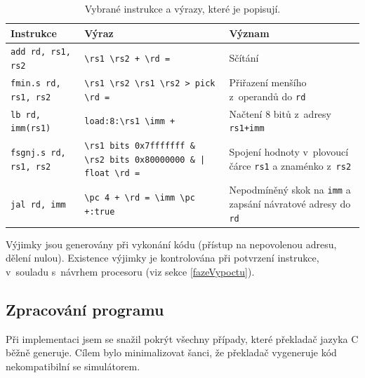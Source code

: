 \begin{table}[]
\begin{tabular}{|l|p{5cm}|p{5cm}|}
\hline
Instrukce            & Výraz                                                                                                                  & Význam                                                   \\ \hline\hline
\texttt{add rd, rs1, rs2}     & \texttt{\textbackslash{}rs1 \textbackslash{}rs2 + \textbackslash{}rd =}                                                         & Sčítání                                                  \\ \hline
\texttt{fmin.s rd, rs1, rs2}  & \texttt{\textbackslash{}rs1 \textbackslash{}rs2 \textbackslash{}rs1 \textbackslash{}rs2 \textgreater\ pick \textbackslash{}rd =} & Přiřazení menšího z~operandů do \texttt{rd}                       \\ \hline
\texttt{lb rd, imm(rs1)}      & \texttt{load:8:\textbackslash{}rs1 \textbackslash{}imm +}                                                                     & Načtení 8 bitů z~adresy \texttt{rs1+imm}                          \\ \hline
\texttt{fsgnj.s rd, rs1, rs2} & \texttt{\textbackslash{}rs1 bits 0x7fffffff \& \textbackslash{}rs2 bits 0x80000000 \& | float \textbackslash{}rd =}             & Spojení hodnoty v~plovoucí čárce \texttt{rs1} a znaménko z~\texttt{rs2}    \\ \hline
\texttt{jal rd, imm}          & \texttt{\textbackslash{}pc 4 + \textbackslash{}rd = \textbackslash{}imm \textbackslash{}pc +:true}                              & Nepodmíněný skok na \texttt{imm} a zapsání návratové adresy do \texttt{rd} \\ \hline
\end{tabular}
\caption{Vybrané instrukce a výrazy, které je popisují.}
\label{interpreTable}
\end{table}

Výjimky jsou generovány při vykonání kódu (přístup na nepovolenou adresu, dělení nulou).
Existence výjimky je kontrolována při potvrzení instrukce, v~souladu s~návrhem procesoru (viz sekce \ref{fazeVypoctu}).

\subsection{Zpracování programu}
\label{parsingAsmCode}

Při implementaci jsem se snažil pokrýt všechny případy, které překladač jazyka C běžně generuje.
Cílem bylo minimalizovat šanci, že překladač vygeneruje kód nekompatibilní se simulátorem.


